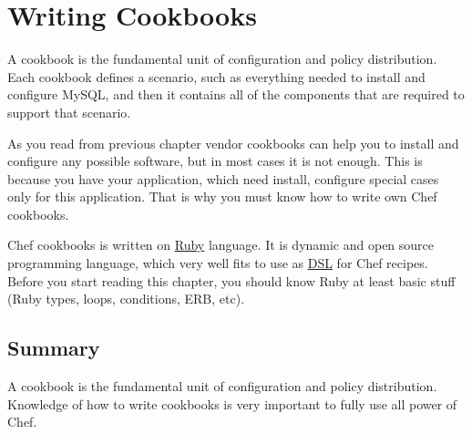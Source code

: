 \chapter{Writing Cookbooks}

A cookbook is the fundamental unit of configuration and policy distribution. Each cookbook defines a scenario, such as everything needed to install and configure MySQL, and then it contains all of the components that are required to support that scenario.

As you read from previous chapter vendor cookbooks can help you to install and configure any possible software, but in most cases it is not enough. This is because you have your application, which need install, configure special cases only for this application. That is why you must know how to write own Chef cookbooks.

Chef cookbooks is written on \href{https://www.ruby-lang.org}{Ruby} language. It is dynamic and open source programming language, which very well fits to use as \href{http://en.wikipedia.org/wiki/Domain-specific\_language}{DSL} for Chef recipes. Before you start reading this chapter, you should know Ruby at least basic stuff (Ruby types, loops, conditions, ERB, etc).












\section{Summary}

A cookbook is the fundamental unit of configuration and policy distribution. Knowledge of how to write cookbooks is very important to fully use all power of Chef.
